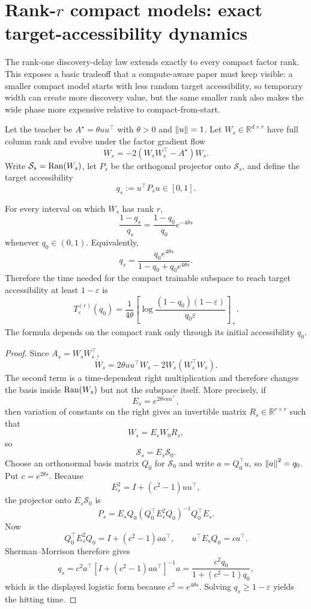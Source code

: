\section{Rank-$r$ compact models: exact target-accessibility dynamics}
The rank-one discovery-delay law extends exactly to every compact factor rank. This exposes a basic tradeoff that a compute-aware paper must keep visible: a smaller compact model starts with less random target accessibility, so temporary width can create more discovery value, but the same smaller rank also makes the wide phase more expensive relative to compact-from-start.

Let the teacher be $A^\star=\theta uu^\top$ with $\theta>0$ and $\left\lVert u\right\rVert=1$. Let $W_s\in\mathbb R^{d\times r}$ have full column rank and evolve under the factor gradient flow
\[
\dot W_s=-2(W_sW_s^\top-A^\star)W_s.
\]
Write $\mathcal S_s=\mathrm{Ran}(W_s)$, let $P_s$ be the orthogonal projector onto $\mathcal S_s$, and define the target accessibility
\[
q_s:=u^\top P_su\in[0,1].
\]

\begin{theorem}\label{thm:rankr-accessibility}
For every interval on which $W_s$ has rank $r$,
\[
\boxed{
\frac{1-q_s}{q_s}
=
\frac{1-q_0}{q_0}e^{-4\theta s}}
\]
whenever $q_0\in(0,1)$. Equivalently,
\[
\boxed{
q_s
=
\frac{q_0e^{4\theta s}}
{1-q_0+q_0e^{4\theta s}}.}
\]
Therefore the time needed for the compact trainable subspace to reach target accessibility at least $1-\varepsilon$ is
\[
\boxed{
T_\varepsilon^{(r)}(q_0)
=
\frac1{4\theta}
\left[
\log\frac{(1-q_0)(1-\varepsilon)}{q_0\varepsilon}
\right]_+.}
\]
The formula depends on the compact rank only through its initial accessibility $q_0$.
\end{theorem}

\begin{proof}
Since $A_s=W_sW_s^\top$,
\[
\dot W_s
=2\theta uu^\top W_s-2W_s(W_s^\top W_s).
\]
The second term is a time-dependent right multiplication and therefore changes the basis inside $\mathrm{Ran}(W_s)$ but not the subspace itself. More precisely, if
\[
E_s=e^{2\theta s uu^\top},
\]
then variation of constants on the right gives an invertible matrix $R_s\in\mathbb R^{r\times r}$ such that
\[
W_s=E_sW_0R_s,
\]
so
\[
\mathcal S_s=E_s\mathcal S_0.
\]
Choose an orthonormal basis matrix $Q_0$ for $\mathcal S_0$ and write $a=Q_0^\top u$, so $\left\lVert a\right\rVert^2=q_0$. Put $c=e^{2\theta s}$. Because
\[
E_s^2=I+(c^2-1)uu^\top,
\]
the projector onto $E_s\mathcal S_0$ is
\[
P_s
=E_sQ_0(Q_0^\top E_s^2Q_0)^{-1}Q_0^\top E_s.
\]
Now
\[
Q_0^\top E_s^2Q_0=I+(c^2-1)aa^\top,
\qquad
u^\top E_sQ_0=ca^\top.
\]
Sherman--Morrison therefore gives
\[
q_s
=c^2a^\top[I+(c^2-1)aa^\top]^{-1}a
=\frac{c^2q_0}{1+(c^2-1)q_0},
\]
which is the displayed logistic form because $c^2=e^{4\theta s}$. Solving $q_s\ge1-\varepsilon$ yields the hitting time.
\end{proof}

